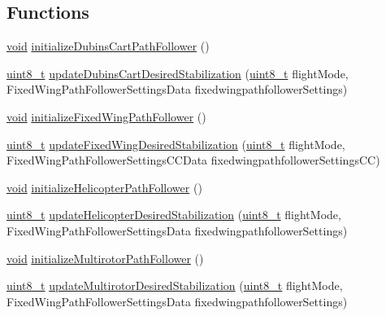 \subsection*{Functions}
\begin{DoxyCompactItemize}
\item 
\hyperlink{group___n_a_m_e_ga18028b8badbf1ea7e704ccac3c488e82}{void} \hyperlink{group___path_follower_ga5132cbfe164bb15242a595443d5f14e0}{initialize\-Dubins\-Cart\-Path\-Follower} ()
\item 
\hyperlink{stdint_8h_aba7bc1797add20fe3efdf37ced1182c5}{uint8\-\_\-t} \hyperlink{group___path_follower_gae4ebfbf2bba2c443a0875621cdd6a870}{update\-Dubins\-Cart\-Desired\-Stabilization} (\hyperlink{stdint_8h_aba7bc1797add20fe3efdf37ced1182c5}{uint8\-\_\-t} flight\-Mode, Fixed\-Wing\-Path\-Follower\-Settings\-Data fixedwingpathfollower\-Settings)
\item 
\hyperlink{group___n_a_m_e_ga18028b8badbf1ea7e704ccac3c488e82}{void} \hyperlink{group___path_follower_ga7d8eb83e8373b42a40717506c8c953c9}{initialize\-Fixed\-Wing\-Path\-Follower} ()
\item 
\hyperlink{stdint_8h_aba7bc1797add20fe3efdf37ced1182c5}{uint8\-\_\-t} \hyperlink{group___path_follower_gacf0ea8d467be6deba4ad79632e42ac48}{update\-Fixed\-Wing\-Desired\-Stabilization} (\hyperlink{stdint_8h_aba7bc1797add20fe3efdf37ced1182c5}{uint8\-\_\-t} flight\-Mode, Fixed\-Wing\-Path\-Follower\-Settings\-C\-C\-Data fixedwingpathfollower\-Settings\-C\-C)
\item 
\hyperlink{group___n_a_m_e_ga18028b8badbf1ea7e704ccac3c488e82}{void} \hyperlink{group___path_follower_ga1bb2c3bf9c6792e0ff0a042d4c96201e}{initialize\-Helicopter\-Path\-Follower} ()
\item 
\hyperlink{stdint_8h_aba7bc1797add20fe3efdf37ced1182c5}{uint8\-\_\-t} \hyperlink{group___path_follower_ga3d17785ce335b62ef6a5c6c3128807a6}{update\-Helicopter\-Desired\-Stabilization} (\hyperlink{stdint_8h_aba7bc1797add20fe3efdf37ced1182c5}{uint8\-\_\-t} flight\-Mode, Fixed\-Wing\-Path\-Follower\-Settings\-Data fixedwingpathfollower\-Settings)
\item 
\hyperlink{group___n_a_m_e_ga18028b8badbf1ea7e704ccac3c488e82}{void} \hyperlink{group___path_follower_ga672d5e0ecf8a7d758f4b787caa6b1ea2}{initialize\-Multirotor\-Path\-Follower} ()
\item 
\hyperlink{stdint_8h_aba7bc1797add20fe3efdf37ced1182c5}{uint8\-\_\-t} \hyperlink{group___path_follower_ga31301e7624c476ead7805402b7b221a6}{update\-Multirotor\-Desired\-Stabilization} (\hyperlink{stdint_8h_aba7bc1797add20fe3efdf37ced1182c5}{uint8\-\_\-t} flight\-Mode, Fixed\-Wing\-Path\-Follower\-Settings\-Data fixedwingpathfollower\-Settings)
\end{DoxyCompactItemize}


